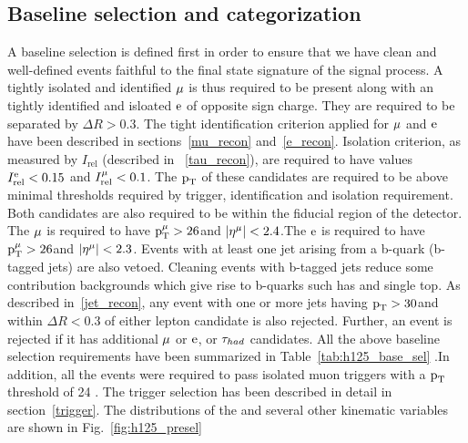 \subsection{Baseline selection and categorization}
\label{h125_evt_sel_bkg}
A baseline selection is defined first in order to ensure that we have clean and well-defined events faithful to the final state signature of the signal process. A tightly isolated and identified $\mu$ is thus required to be present along with an tightly identified and isloated $\text{e}$ of opposite sign charge. They are required to be separated by $\Delta R > 0.3$. The tight identification criterion applied for $\mu$ and $\text{e}$ have been described in sections~\ref{mu_recon} and~\ref{e_recon}. Isolation criterion, as measured by $I_\text{rel}$ (described in ~\ref{tau_recon}), are required to have values $I_\text{rel}^{\text{e}} < 0.15$ and $I_\text{rel}^{\mu} < 0.1$. The $\text{p}_\text{T}$ of these candidates are required to be above minimal thresholds required by trigger, identification and isolation requirement. Both candidates are also required to be within the fiducial region of the detector. The $\mu$ is required to have $\text{p}_\text{T}^{\mu} > 26$\GeV and $|\eta^{\mu}|<2.4$.The $\text{e}$ is required to have $\text{p}_\text{T}^{\mu} > 26$\GeV and $|\eta^{\mu}|<2.3$. Events with at least one jet arising from a b-quark (b-tagged jets) are also vetoed. Cleaning events with b-tagged jets reduce some contribution backgrounds which give rise to b-quarks such has \ttb and single top. As described in~\ref{jet_recon}, any event with one or more jets having $\text{p}_\text{T}>30$\GeV and within $\Delta R < 0.3$ of either lepton candidate is also rejected. Further, an event is rejected if it has additional $\mu$ or $\text{e}$, or $\tau_{had}$ candidates. All the above baseline selection requirements have been summarized in Table~\ref{tab:h125_base_sel}  .In addition, all the events were required to pass isolated muon triggers with a $\text{p}_\text{T}$ threshold of 24 \GeV. The trigger selection has been described in detail in section~\ref{trigger}. The distributions of the \mcol and several other  kinematic variables are shown in Fig.~\ref{fig:h125_presel}  


